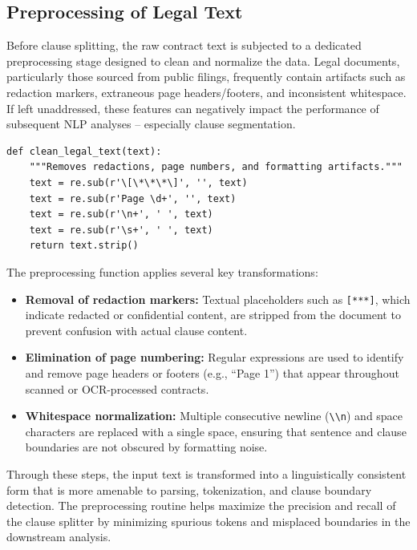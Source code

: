 \documentclass[twoside,final]{hcmut-report}
\begin{document}
\subsection{Preprocessing of Legal Text}
Before clause splitting, the raw contract text is subjected to a dedicated preprocessing stage designed to clean and normalize the data. Legal documents, particularly those sourced from public filings, frequently contain artifacts such as redaction markers, extraneous page headers/footers, and inconsistent whitespace. If left unaddressed, these features can negatively impact the performance of subsequent NLP analyses -- especially clause segmentation.

\begin{verbatim}
def clean_legal_text(text):
    """Removes redactions, page numbers, and formatting artifacts."""
    text = re.sub(r'\[\*\*\*\]', '', text)
    text = re.sub(r'Page \d+', '', text)
    text = re.sub(r'\n+', ' ', text)
    text = re.sub(r'\s+', ' ', text)
    return text.strip()
\end{verbatim}

The preprocessing function applies several key transformations:
\begin{itemize}[topsep=0pt, parsep=0pt, itemsep=0pt]
  \item \textbf{Removal of redaction markers:} Textual placeholders such as \verb|[***]|, which indicate redacted or confidential content, are stripped from the document to prevent confusion with actual clause content.
  \item \textbf{Elimination of page numbering:} Regular expressions are used to identify and remove page headers or footers (e.g., ``Page 1'') that appear throughout scanned or OCR-processed contracts.
  \item \textbf{Whitespace normalization:} Multiple consecutive newline (\verb|\\n|) and space characters are replaced with a single space, ensuring that sentence and clause boundaries are not obscured by formatting noise.
\end{itemize}

Through these steps, the input text is transformed into a linguistically consistent form that is more amenable to parsing, tokenization, and clause boundary detection. The preprocessing routine helps maximize the precision and recall of the clause splitter by minimizing spurious tokens and misplaced boundaries in the downstream analysis.
\end{document}
